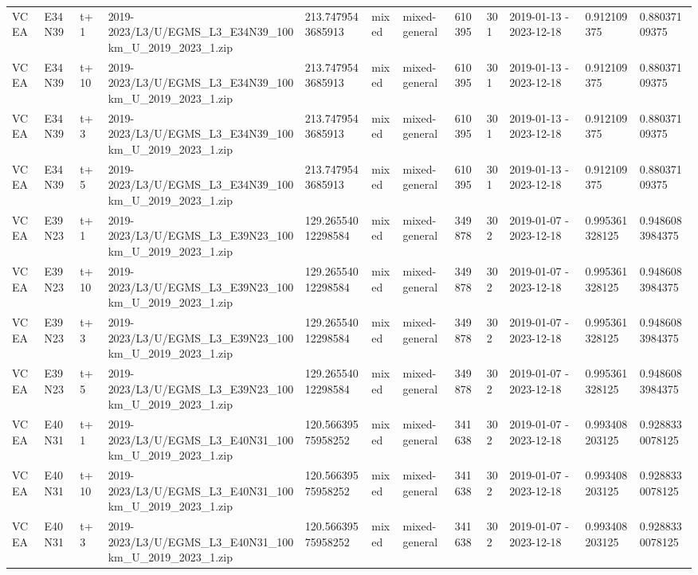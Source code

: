 \begin{landscape}
\begin{longtable}{llllllllllll}
VCEA & E34N39 & t+1 & 2019-2023/L3/U/EGMS\_L3\_E34N39\_100km\_U\_2019\_2023\_1.zip & 213.7479543685913 & mixed & mixed-general & 610395 & 301 & 2019-01-13 - 2023-12-18 & 0.912109375 & 0.88037109375 \\
VCEA & E34N39 & t+10 & 2019-2023/L3/U/EGMS\_L3\_E34N39\_100km\_U\_2019\_2023\_1.zip & 213.7479543685913 & mixed & mixed-general & 610395 & 301 & 2019-01-13 - 2023-12-18 & 0.912109375 & 0.88037109375 \\
VCEA & E34N39 & t+3 & 2019-2023/L3/U/EGMS\_L3\_E34N39\_100km\_U\_2019\_2023\_1.zip & 213.7479543685913 & mixed & mixed-general & 610395 & 301 & 2019-01-13 - 2023-12-18 & 0.912109375 & 0.88037109375 \\
VCEA & E34N39 & t+5 & 2019-2023/L3/U/EGMS\_L3\_E34N39\_100km\_U\_2019\_2023\_1.zip & 213.7479543685913 & mixed & mixed-general & 610395 & 301 & 2019-01-13 - 2023-12-18 & 0.912109375 & 0.88037109375 \\
VCEA & E39N23 & t+1 & 2019-2023/L3/U/EGMS\_L3\_E39N23\_100km\_U\_2019\_2023\_1.zip & 129.26554012298584 & mixed & mixed-general & 349878 & 302 & 2019-01-07 - 2023-12-18 & 0.995361328125 & 0.9486083984375 \\
VCEA & E39N23 & t+10 & 2019-2023/L3/U/EGMS\_L3\_E39N23\_100km\_U\_2019\_2023\_1.zip & 129.26554012298584 & mixed & mixed-general & 349878 & 302 & 2019-01-07 - 2023-12-18 & 0.995361328125 & 0.9486083984375 \\
VCEA & E39N23 & t+3 & 2019-2023/L3/U/EGMS\_L3\_E39N23\_100km\_U\_2019\_2023\_1.zip & 129.26554012298584 & mixed & mixed-general & 349878 & 302 & 2019-01-07 - 2023-12-18 & 0.995361328125 & 0.9486083984375 \\
VCEA & E39N23 & t+5 & 2019-2023/L3/U/EGMS\_L3\_E39N23\_100km\_U\_2019\_2023\_1.zip & 129.26554012298584 & mixed & mixed-general & 349878 & 302 & 2019-01-07 - 2023-12-18 & 0.995361328125 & 0.9486083984375 \\
VCEA & E40N31 & t+1 & 2019-2023/L3/U/EGMS\_L3\_E40N31\_100km\_U\_2019\_2023\_1.zip & 120.56639575958252 & mixed & mixed-general & 341638 & 302 & 2019-01-07 - 2023-12-18 & 0.993408203125 & 0.9288330078125 \\
VCEA & E40N31 & t+10 & 2019-2023/L3/U/EGMS\_L3\_E40N31\_100km\_U\_2019\_2023\_1.zip & 120.56639575958252 & mixed & mixed-general & 341638 & 302 & 2019-01-07 - 2023-12-18 & 0.993408203125 & 0.9288330078125 \\
VCEA & E40N31 & t+3 & 2019-2023/L3/U/EGMS\_L3\_E40N31\_100km\_U\_2019\_2023\_1.zip & 120.56639575958252 & mixed & mixed-general & 341638 & 302 & 2019-01-07 - 2023-12-18 & 0.993408203125 & 0.9288330078125 \\

\end{longtable}
\end{landscape}
